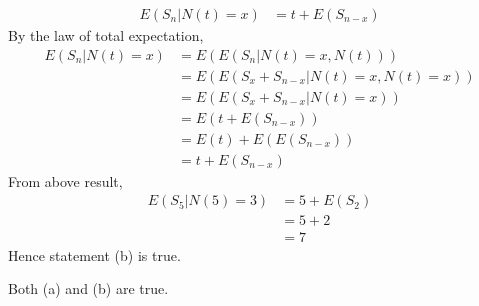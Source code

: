 \documentclass[journal,12pt,onecolumn]{IEEEtran}
\theoremstyle{remark}
\begin{document}
\begin{enumerate}[label=(\alph*)]
\begin{align}
E(S_n|N(t)=x)&=t+E(S_{n-x})
\end{align}
By the law of total expectation,
\begin{align}
E(S_n | N(t) = x) &= E(E(S_n | N(t) = x, N(t))) \\
&= E(E(S_x + S_{n-x} | N(t) = x, N(t) = x))\\
&= E(E(S_x + S_{n-x} | N(t) = x))\\
&=E(t + E(S_{n-x})) \\
&=E(t) + E(E(S_{n-x}))\\
 &= t + E(S_{n-x})
 \end{align}
 From above result,
 \begin{align}
 E(S_5|N(5)=3)&=5+E(S_2)\\
 &=5+2\\
 &=7
 \end{align}
 Hence statement (b) is true.
\end{enumerate}
Both (a) and (b) are true.
\end{document}
